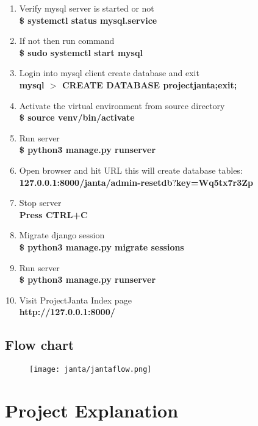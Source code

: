 \documentclass{article}
\begin{document}
\begin{enumerate}
\item  Verify mysql server is started or not
\\
 \textbf {\$ systemctl status mysql.service}

\item If not then run command
\\
\textbf {\$ sudo systemctl start mysql}


\item Login into mysql client create database and exit
\\
\textbf {mysql $>$ CREATE DATABASE projectjanta;exit;}


\item  Activate the virtual environment from source directory\\
\textbf {\$ source venv/bin/activate}


\item Run server\\ 
\textbf {\$ python3 manage.py runserver}


\item  Open browser and hit URL this will create database tables:
\\
\textbf {127.0.0.1:8000/janta/admin-resetdb$?$key=Wq5tx7r3Zp}


\item  Stop server
\\
\textbf {Press CTRL+C}


\item Migrate django session\\ 
\textbf {\$ python3 manage.py migrate sessions}


\item Run server\\ 
\textbf {\$ python3 manage.py runserver}


\item  Visit ProjectJanta Index page
\\
\textbf {http://127.0.0.1:8000/}
\end{enumerate}

\subsection{Flow chart}

\begin{figure}[htp]
    \texttt{[image: janta/jantaflow.png]}
\end{figure}

\newpage

\section{Project Explanation}
\end{document}
